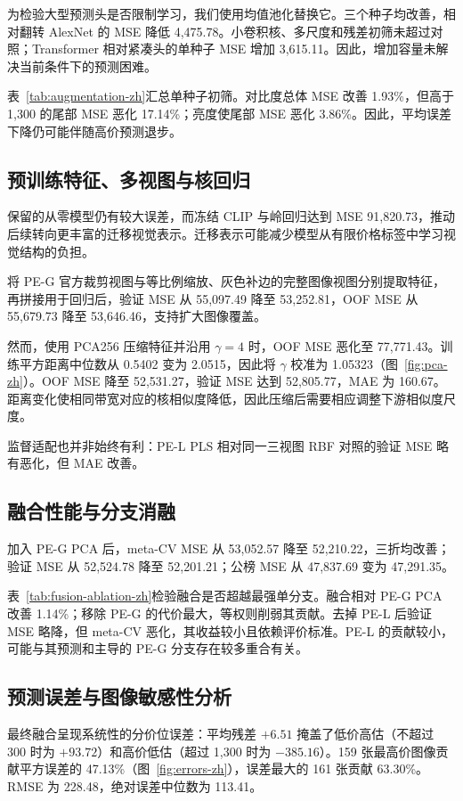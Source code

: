 \documentclass[conference,a4paper]{IEEEtran}
\begin{document}
为检验大型预测头是否限制学习，我们使用均值池化替换它。三个种子均改善，相对翻转 AlexNet 的 MSE 降低 4,475.78。小卷积核、多尺度和残差初筛未超过对照；Transformer 相对紧凑头的单种子 MSE 增加 3,615.11。因此，增加容量未解决当前条件下的预测困难。

表~\ref{tab:augmentation-zh}汇总单种子初筛。对比度总体 MSE 改善 1.93\%，但高于 1,300 的尾部 MSE 恶化 17.14\%；亮度使尾部 MSE 恶化 3.86\%。因此，平均误差下降仍可能伴随高价预测退步。





\subsection{预训练特征、多视图与核回归}
保留的从零模型仍有较大误差，而冻结 CLIP 与岭回归达到 MSE 91,820.73，推动后续转向更丰富的迁移视觉表示。迁移表示可能减少模型从有限价格标签中学习视觉结构的负担。

将 PE-G 官方裁剪视图与等比例缩放、灰色补边的完整图像视图分别提取特征，再拼接用于回归后，验证 MSE 从 55,097.49 降至 53,252.81，OOF MSE 从 55,679.73 降至 53,646.46，支持扩大图像覆盖。

然而，使用 PCA256 压缩特征并沿用 $\gamma=4$ 时，OOF MSE 恶化至 77,771.43。训练平方距离中位数从 0.5402 变为 2.0515，因此将 $\gamma$ 校准为 1.05323（图~\ref{fig:pca-zh}）。OOF MSE 降至 52,531.27，验证 MSE 达到 52,805.77，MAE 为 160.67。距离变化使相同带宽对应的核相似度降低，因此压缩后需要相应调整下游相似度尺度。

监督适配也并非始终有利：PE-L PLS 相对同一三视图 RBF 对照的验证 MSE 略有恶化，但 MAE 改善。

\subsection{融合性能与分支消融}
加入 PE-G PCA 后，meta-CV MSE 从 53,052.57 降至 52,210.22，三折均改善；验证 MSE 从 52,524.78 降至 52,201.21；公榜 MSE 从 47,837.69 变为 47,291.35。

表~\ref{tab:fusion-ablation-zh}检验融合是否超越最强单分支。融合相对 PE-G PCA 改善 1.14\%；移除 PE-G 的代价最大，等权则削弱其贡献。去掉 PE-L 后验证 MSE 略降，但 meta-CV 恶化，其收益较小且依赖评价标准。PE-L 的贡献较小，可能与其预测和主导的 PE-G 分支存在较多重合有关。

\subsection{预测误差与图像敏感性分析}
最终融合呈现系统性的分价位误差：平均残差 $+6.51$ 掩盖了低价高估（不超过 300 时为 $+93.72$）和高价低估（超过 1,300 时为 $-385.16$）。159 张最高价图像贡献平方误差的 47.13\%（图~\ref{fig:errors-zh}），误差最大的 161 张贡献 63.30\%。RMSE 为 228.48，绝对误差中位数为 113.41。
\end{document}
